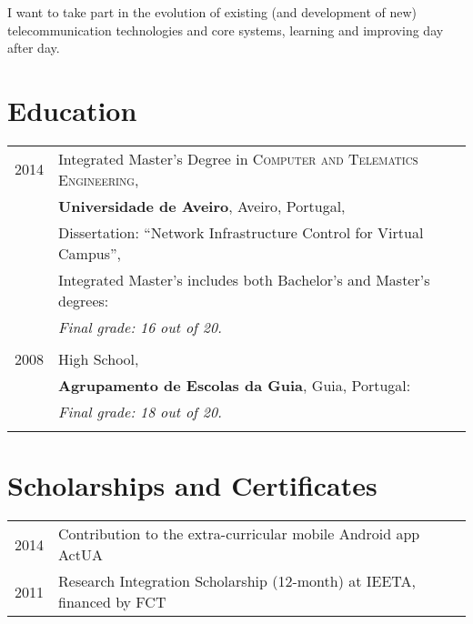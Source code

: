 \documentclass[a4paper,10pt]{article} %
\begin{document}
I want to take part in the evolution of existing (and development of new) telecommunication technologies 
and core systems, learning and improving day after day. \\



\section{Education}

\begin{tabular}{rl}	
\textsc{2014} & Integrated Master's Degree in \textsc{Computer and Telematics Engineering}, \\
&\textbf{Universidade de Aveiro}, Aveiro, Portugal, \\
& Dissertation: ``Network Infrastructure Control for Virtual Campus'', \\
& Integrated Master's includes both Bachelor's and Master's degrees: \\
& \textit{Final grade: 16 out of 20.}\\
&\\


\textsc{2008} & High School, \\
&\textbf{Agrupamento de Escolas da Guia}, Guia, Portugal: \\
& \textit{Final grade: 18 out of 20.}\\
&\\


\end{tabular}


\section{Scholarships and Certificates}

\begin{tabular}{rl}
\textsc{2014} & Contribution to the extra-curricular mobile Android app ActUA \normalsize\\
\textsc{2011} & Research Integration Scholarship (12-month) at IEETA, financed by FCT \normalsize\\
\end{tabular} \\
\end{document}
